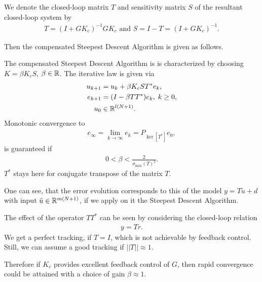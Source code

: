 We denote the closed-loop matrix $T$ and sensitivity matrix $S$ of the resultant closed-loop system by
\begin{align}
T = (I + G K_c)^{-1}G K_c \text{ and } S  = I - T =  (I + G K_c)^{-1}.
\end{align}

Then the compensated Steepest Descent Algorithm is given as follows. 

\begin{alg}
	\label{alg: FBDesign}
	The compensated Steepest Descent Algorithm is  is characterized by choosing  $K = \beta K_c S$, $\beta \in {\mathbb{R}}$. 
	The iterative law is given via 
	\begin{align}
	\label{eq:errFBDesign}
	\begin{split}
	u_{k+1} &= u_k + \beta K_c S T^* e_k, \\
	e_{k+1} &= (I- \beta T T^*) e_{k}, \; k\geq 0,\\
	u_0& \in {\mathbb{R}}^{l (N+1)}. 
	\end{split}	
	\end{align}
	Monotonic convergence to 
	\begin{align}
	\label{eq:FDErrLim} 
	e_\infty  = \lim_{k\to\infty} e_k = P_{\ker[T^*]}e_0,
	\end{align} 
	is guaranteed if
	\begin{align*}
	0 <\beta < \frac{2}{\sigma_{\max}(T)^2}.
\end{align*}
$T^*$ stays here for conjugate transpose of the matrix $T$. 
\end{alg}

One can see, that the error evolution corresponds to this of the model $y = T \tilde{u} + d$ with input $\tilde{u} 
\in {\mathbb{R}}^{m(N+1)}$, if we apply on it the Steepest Descent Algorithm.

The effect of the operator $T T^*$ can be seen by considering the closed-loop relation 
\begin{align}
y = Tr.
\end{align}
We get a perfect tracking, if $T = I$, which is not achievable by feedback control. Still, we can assume a good tracking if $||T|| \approx 1$. 

Therefore if $K_c$ provides excellent feedback control of $G$, then rapid convergence could be attained with a choice of gain $\beta \approx 1$. %







